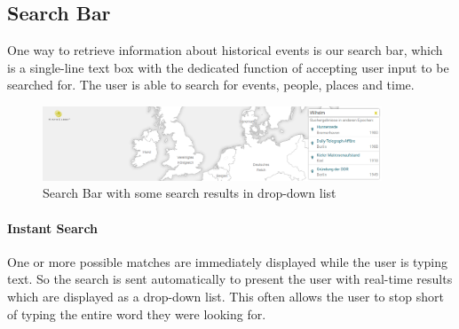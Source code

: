 \subsection{Search Bar} %
\label{sub:search_bar}

One way to retrieve information about historical events is our search bar, which is a single-line text box with the dedicated function of accepting user input to be searched for. The user is able to search for events, people, places and time.

\begin{figure}[H]
  \begin{center}
    \includegraphics[width=0.9\textwidth]{graphics/search.png}
  \end{center}
  \caption{Search Bar with some search results in drop-down list}
  \label{fig:search}
\end{figure}

\paragraph{Instant Search} %
\label{par:instant_search}
One or more possible matches are immediately displayed while the user is typing text. So the search is sent automatically to present the user with real-time results which are displayed as a drop-down list. This often allows the user to stop short of typing the entire word they were looking for.

